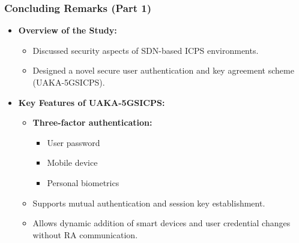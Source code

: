 \documentclass[9pt,handout]{beamer}
\begin{document}
\begin{frame}
    \frametitle{Concluding Remarks (Part 1)}
    \begin{itemize}
        \item \textbf{Overview of the Study:}
        \begin{itemize}
            \item Discussed security aspects of SDN-based ICPS environments.
            \item Designed a novel secure user authentication and key agreement scheme (UAKA-5GSICPS).
        \end{itemize}
        \item \textbf{Key Features of UAKA-5GSICPS:}
        \begin{itemize}
            \item \textbf{Three-factor authentication:} 
            \begin{itemize}
                \item User password
                \item Mobile device
                \item Personal biometrics
            \end{itemize}
            \item Supports mutual authentication and session key establishment.
            \item Allows dynamic addition of smart devices and user credential changes without RA communication.
        \end{itemize}
    \end{itemize}
\end{frame}
\end{document}
